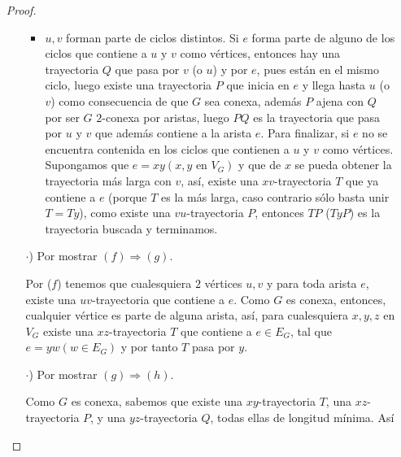 \documentclass{article}
\begin{document}
\begin{enumerate}
\begin{proof}
\begin{itemize}
\begin{itemize}
                            \item $u, v$ forman parte de ciclos distintos. Si $e$ forma
                                parte de alguno de los ciclos que contiene a $u$ y $v$ como
                                vértices, entonces hay una trayectoria $Q$ que pasa por $v$
                                (o $u$) y por $e$, pues están en el mismo ciclo, luego existe
                                una trayectoria $P$ que inicia en $e$ y llega hasta $u$ (o $v$)
                                como consecuencia de que $G$ sea conexa, además $P$ ajena con $Q$
                                por ser $G$ $2$-conexa por aristas, luego $PQ$ es la trayectoria
                                que pasa por $u$ y $v$ que además contiene a la arista $e$. Para
                                finalizar, si $e$ no se encuentra contenida en los ciclos que
                                contienen a $u$ y $v$ como vértices. Supongamos que
                                $e = xy (x, y \text{ en } V_G)$ y que de $x$ se pueda obtener la
                                trayectoria más larga con $v$, así, existe una $xv$-trayectoria $T$
                                que ya contiene a $e$ (porque $T$ es la más larga, caso contrario
                                sólo basta unir $T = Ty$), como existe una $vu$-trayectoria $P$,
                                entonces $TP$ ($TyP$) es la trayectoria buscada y terminamos.
                        \end{itemize}

                    \item[$\cdot$)] Por mostrar $(f) \Rightarrow (g)$.

                        Por ($f$) tenemos que cualesquiera $2$ vértices $u, v$ y para
                        toda arista $e$, existe una $uv$-trayectoria que contiene a $e$.
                        Como $G$ es conexa, entonces, cualquier vértice es parte de alguna
                        arista, así, para cualesquiera $x, y, z$ en $V_G$ existe una
                        $xz$-trayectoria $T$ que contiene a $e \in E_G$, tal que $e =
                        yw (w \in E_G)$ y por tanto $T$ pasa por $y$.

                    \item[$\cdot$)] Por mostrar $(g) \Rightarrow (h)$.

                        Como $G$ es conexa, sabemos que existe una $xy$-trayectoria $T$,
                        una $xz$-trayectoria $P$, y una $yz$-trayectoria $Q$, todas ellas
                        de longitud mínima. Así


\end{itemize}
\end{proof}
\end{enumerate}
\end{document}
